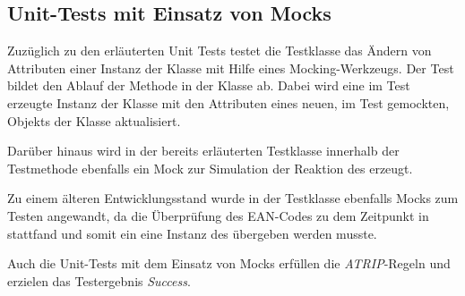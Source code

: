 \subsection*{Unit-Tests mit Einsatz von Mocks}
Zuzüglich zu den erläuterten Unit Tests testet die Testklasse \href{}{} das Ändern von Attributen einer Instanz der Klasse \href{}{} mit Hilfe eines Mocking-Werkzeugs.
Der Test bildet den Ablauf der Methode \href{}{} in der Klasse \href{}{} ab.
Dabei wird eine im Test erzeugte Instanz der Klasse \href{}{} mit den Attributen eines neuen, im Test gemockten, Objekts der Klasse \href{}{} aktualisiert.

Darüber hinaus wird in der bereits erläuterten Testklasse \href{}{} innerhalb der Testmethode \href{}{} ebenfalls ein Mock zur Simulation der Reaktion des \href{}{} erzeugt.

Zu einem älteren Entwicklungsstand wurde in der Testklasse \href{}{} ebenfalls Mocks zum Testen angewandt, da die Überprüfung des \ac{EAN}-Codes zu dem Zeitpunkt in \href{}{} stattfand und somit ein eine Instanz des \href{}{} übergeben werden musste.

Auch die Unit-Tests mit dem Einsatz von Mocks erfüllen die \textit{ATRIP}-Regeln und erzielen das Testergebnis \textit{Success}.

